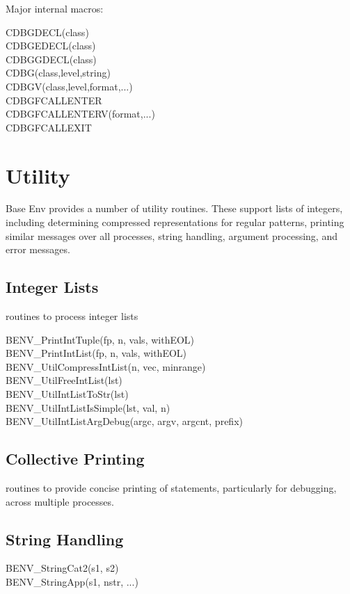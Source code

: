 \documentclass[11pt,letterpaper]{report}
\begin{document}
Major internal macros:
\begin{description}
\item[CDBGDECL(class)]
\item[CDBGEDECL(class)]
\item[CDBGGDECL(class)]
\item[CDBG(class,level,string)]
\item[CDBGV(class,level,format,...)]
\item[CDBGFCALLENTER]
\item[CDBGFCALLENTERV(format,...)]
\item[CDBGFCALLEXIT]
\end{description}

\chapter{Utility}
Base Env provides a number of utility routines.
These support lists of integers, including determining compressed
representations for regular patterns, printing similar messages over
all processes, string handling, argument processing, and error
messages.

\section{Integer Lists}
routines to process integer lists

\begin{description}
\item[BENV\_PrintIntTuple(fp, n, vals, withEOL)]
\item[BENV\_PrintIntList(fp, n, vals, withEOL)]
\item[BENV\_UtilCompressIntList(n, vec, minrange)]
\item[BENV\_UtilFreeIntList(lst)]
\item[BENV\_UtilIntListToStr(lst)]
\item[BENV\_UtilIntListIsSimple(lst, val, n)]
\item[BENV\_UtilIntListArgDebug(argc, argv, argcnt, prefix)]
\end{description}

\section{Collective Printing}
routines to provide concise printing of statements, particularly for
debugging, across multiple processes.

\section{String Handling}
\begin{description}
\item[BENV\_StringCat2(s1, s2)]
\item[BENV\_StringApp(s1, nstr, ...)]
\end{description}
\end{document}
